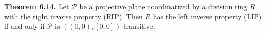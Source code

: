 \textbf{Theorem 6.14.} Let $\mathcal{P}$ be a projective plane coordinatized by a division ring $R$ with the right inverse property (RIP). Then $R$ has the left inverse property (LIP) if and only if $\mathcal{P}$ is $((0,0), [0,0])$-transitive.
